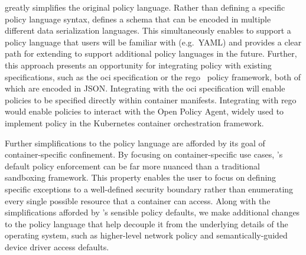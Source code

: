 
\bpfcontain{} greatly simplifies the original \bpfbox{} policy language. Rather than
defining a specific policy language syntax, \bpfcontain{} defines a schema that can be
encoded in multiple different data serialization languages.  This simultaneously enables
\bpfcontain{} to support a policy language that users will be familiar with (e.g.~YAML)
and provides a clear path for extending \bpfcontain{} to support additional policy
languages in the future. Further, this approach presents an opportunity for integrating
\bpfcontain{} policy with existing specifications, such as the \gls{oci} specification or
the rego~\cite{rego} policy framework, both of which are encoded in JSON\@. Integrating
with the \gls{oci} specification will enable \bpfcontain{} policies to be specified
directly within container manifests. Integrating with rego would enable \bpfcontain{}
policies to interact with the Open Policy Agent, widely used to implement policy in the
Kubernetes container orchestration framework.

Further simplifications to the \bpfcontain{} policy language are afforded by its goal of
container-specific confinement. By focusing on container-specific use cases,
\bpfcontain{}'s default policy enforcement can be far more nuanced than a traditional
sandboxing framework. This property enables the user to focus on defining specific
exceptions to a well-defined security boundary rather than enumerating every single
possible resource that a container can access. Along with the simplifications afforded by
\bpfcontain{}'s sensible policy defaults, we make additional changes to the policy
language that help decouple it from the underlying details of the operating system, such
as higher-level network policy and semantically-guided device driver access defaults.


